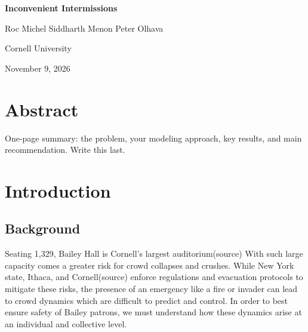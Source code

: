 \documentclass[14pt]{article}
\theoremstyle{definition}
\newcommand{\papertitle}{Inconvenient Intermissions}
\begin{document}
\begin{titlepage}
  \thispagestyle{empty}
  \centering
  \vspace*{2.5cm}
  {\huge\bfseries \papertitle\par}
  \vspace{1.5cm}
  {\large
    Roc Michel \quad Siddharth Menon \quad Peter Olhava\par
    \vspace{0.4cm}
    Cornell University\par
  }
  \vspace{0.8cm}
  {\large November 9, 2026}
  \vfill
  \begin{minipage}{0.85\textwidth}
    \section*{Abstract}
    One-page summary: the problem, your modeling approach, key results,
    and main recommendation. Write this last.

  \end{minipage}
  \vfill
\end{titlepage}

\tableofcontents
\newpage

\section{Introduction}
\subsection{Background}
Seating 1,329, Bailey Hall is Cornell's largest auditorium(source) With such large capacity comes a greater risk for crowd collapses and crushes. While New York state, Ithaca, and Cornell(source) enforce regulations and evacuation protocols to mitigate these risks, the presence of an emergency like a fire or invader can lead to crowd dynamics which are difficult to predict and control. In order to best ensure safety of Bailey patrons, we must understand how these dynamics arise at an individual and collective level.
\end{document}
